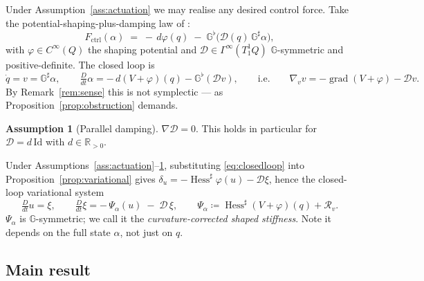 \documentclass[11pt,a4paper]{article}
\newcommand{\Gm}{\mathbb{G}}                      %
\newcommand{\Rm}{\mathbb{R}}
\newcommand{\Gsharp}{\Gm^{\sharp}}
\newcommand{\Gflat}{\Gm^{\flat}}
\newcommand{\Hess}{\operatorname{Hess}}
\newcommand{\grad}{\operatorname{grad}}
\newcommand{\Jac}{\mathcal{R}}
\newcommand{\Damp}{\mathcal{D}}
\newcommand{\Stiff}{\Psi}
\newcommand{\Gsec}[1]{\Gamma^{\infty}(#1)}
\newcommand{\Cinf}[1]{C^{\infty}(#1)}
\newcommand{\id}{\mathrm{Id}}
\newcommand{\Dt}{\tfrac{D}{dt}}
\theoremstyle{plain}
\theoremstyle{definition}
\newtheorem{assumption}[theorem]{Assumption}
\theoremstyle{remark}
\begin{document}
Under Assumption~\ref{ass:actuation} we may realise any desired control force. Take
the potential-shaping-plus-damping law of \cite[\S10.4, \S11.1]{BL04}:
\begin{equation}
  F_{\mathrm{ctrl}}(\alpha) \;=\; -\,d\varphi(q) \;-\; \Gflat\big(\Damp(q)\,\Gsharp\alpha\big),
  \label{eq:feedback}
\end{equation}
with $\varphi \in \Cinf{Q}$ the shaping potential and $\Damp \in \Gsec{T^1_1Q}$
$\Gm$-symmetric and positive-definite. The closed loop is
\begin{equation}
  \dot q = v = \Gsharp\alpha,
  \qquad
  \Dt\alpha = -\,d(V+\varphi)(q) - \Gflat(\Damp v),
  \qquad\text{i.e.}\qquad
  \nabla_v v = -\grad(V+\varphi) - \Damp v.
  \label{eq:closedloop}
\end{equation}
By Remark~\ref{rem:sense} this is not symplectic --- as
Proposition~\ref{prop:obstruction} demands.

\begin{assumption}[Parallel damping]
\label{ass:damping}
$\nabla\Damp = 0$. This holds in particular for $\Damp = d\,\id$ with
$d \in \Rm_{>0}$.
\end{assumption}

Under Assumptions~\ref{ass:actuation}--\ref{ass:damping}, substituting
\eqref{eq:closedloop} into Proposition~\ref{prop:variational} gives
$\delta_u = -\Hess^{\sharp}\varphi(u) - \Damp\xi$, hence the closed-loop
variational system
\begin{equation}
  \boxed{\quad
  \Dt u = \xi,
  \qquad
  \Dt \xi = -\,\Stiff_\alpha(u) \;-\; \Damp\,\xi,
  \qquad
  \Stiff_\alpha \coloneqq \Hess^{\sharp}(V+\varphi)(q) + \Jac_v .
  \quad}
  \label{eq:cl-variational}
\end{equation}
$\Stiff_\alpha$ is $\Gm$-symmetric; we call it the \emph{curvature-corrected
shaped stiffness}. Note it depends on the full state $\alpha$, not just on $q$.

\subsection{Main result}
\end{document}
